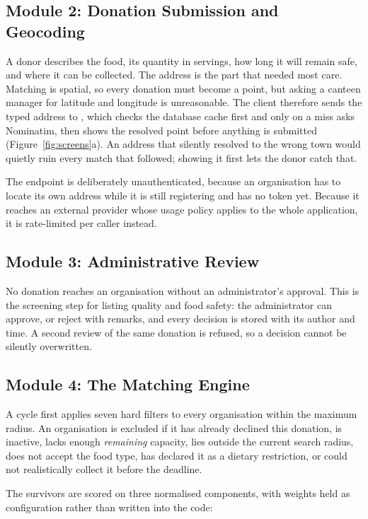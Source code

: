 \documentclass[11pt,a4paper]{report}
\newcommand{\code}[1]{\texttt{\detokenize{#1}}}
\begin{document}
\subsection{Module 2: Donation Submission and Geocoding}

A donor describes the food, its quantity in servings, how long it will remain
safe, and where it can be collected. The address is the part that needed most
care. Matching is spatial, so every donation must become a point, but asking a
canteen manager for latitude and longitude is unreasonable. The client therefore
sends the typed address to \code{POST /api/geocode}, which checks the database
cache first and only on a miss asks Nominatim, then shows the resolved point
before anything is submitted (Figure~\ref{fig:screens}a). An address that
silently resolved to the wrong town would quietly ruin every match that followed;
showing it first lets the donor catch that.

The endpoint is deliberately unauthenticated, because an organisation has to
locate its own address while it is still registering and has no token yet.
Because it reaches an external provider whose usage policy applies to the whole
application, it is rate-limited per caller instead.

\subsection{Module 3: Administrative Review}

No donation reaches an organisation without an administrator's approval. This
is the screening step for listing quality and food safety: the administrator
can approve, or reject with remarks, and every decision is stored with its
author and time. A second review of the same donation is refused, so a decision
cannot be silently overwritten.

\subsection{Module 4: The Matching Engine}

A cycle first applies seven hard filters to every organisation within the
maximum radius. An organisation is excluded if it has already declined this
donation, is inactive, lacks enough \emph{remaining} capacity, lies outside the
current search radius, does not accept the food type, has declared it as a
dietary restriction, or could not realistically collect it before the deadline.

The survivors are scored on three normalised components, with weights held as
configuration rather than written into the code:
\end{document}
